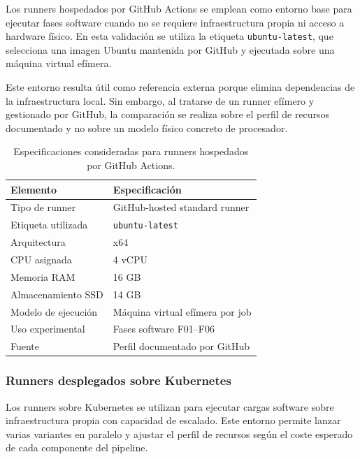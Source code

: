 Los runners hospedados por GitHub Actions se emplean como entorno base para ejecutar fases software cuando no se requiere infraestructura propia ni acceso a hardware físico. En esta validación se utiliza la etiqueta \texttt{ubuntu-latest}, que selecciona una imagen Ubuntu mantenida por GitHub y ejecutada sobre una máquina virtual efímera.

Este entorno resulta útil como referencia externa porque elimina dependencias de la infraestructura local. Sin embargo, al tratarse de un runner efímero y gestionado por GitHub, la comparación se realiza sobre el perfil de recursos documentado y no sobre un modelo físico concreto de procesador.

\begin{table}[htbp]
    \centering
    \caption{Especificaciones consideradas para runners hospedados por GitHub Actions.}
    \label{tab:entorno-github-actions-validacion}
    \begin{tabular}{p{}p{}}
        \hline
        \textbf{Elemento} & \textbf{Especificación} \\
        \hline
        Tipo de runner & GitHub-hosted standard runner \\
        Etiqueta utilizada & \texttt{ubuntu-latest} \\
        Arquitectura & x64 \\
        CPU asignada & 4 vCPU \\
        Memoria RAM & 16 GB \\
        Almacenamiento SSD & 14 GB \\
        Modelo de ejecución & Máquina virtual efímera por job \\
        Uso experimental & Fases software F01--F06 \\
        Fuente & Perfil documentado por GitHub \cite{github_hosted_runners} \\
        \hline
    \end{tabular}
\end{table}

\subsubsection{Runners desplegados sobre Kubernetes}
\label{subsubsec:entorno-kubernetes-validacion}

Los runners sobre Kubernetes se utilizan para ejecutar cargas software sobre infraestructura propia con capacidad de escalado. Este entorno permite lanzar varias variantes en paralelo y ajustar el perfil de recursos según el coste esperado de cada componente del pipeline.

